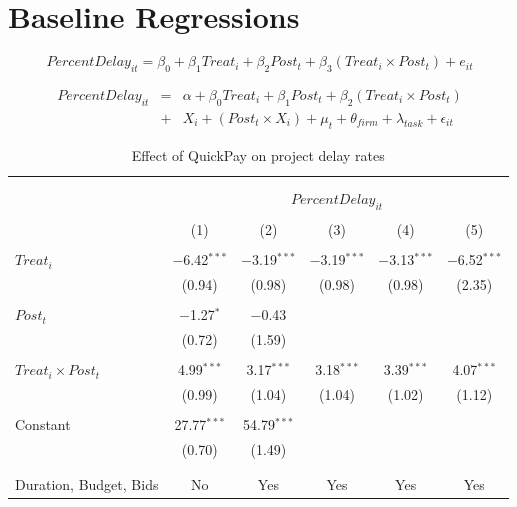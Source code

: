 \documentclass[
]{article}
\begin{document}
\hypertarget{baseline-regressions}{%
\section{Baseline Regressions}\label{baseline-regressions}}

\[ PercentDelay_{it} = \beta_0 + \beta_1 Treat_i + \beta_2 Post_t + \beta_3 (Treat_i \times Post_t) + e_{it}\]

\[ \begin{aligned} PercentDelay_{it} &=& \alpha+\beta_0 Treat_i + \beta_1 Post_t + \beta_2 (Treat_i \times Post_t)\\
&+&  X_i + (Post_t \times X_i) + \mu_t + \theta_{firm} + \lambda_{task}+ \epsilon_{it}
\end{aligned}\]

\begin{table}[H] \centering 
  \caption{Effect of QuickPay on project delay rates} 
  \label{} 
\small 
\begin{tabular}{@{\extracolsep{-2pt}}lccccc} 
\\[-1.8ex]\hline 
\hline \\[-1.8ex] 
\\[-1.8ex] & \multicolumn{5}{c}{$PercentDelay_{it}$} \\ 
\\[-1.8ex] & (1) & (2) & (3) & (4) & (5)\\ 
\hline \\[-1.8ex] 
 $Treat_i$ & $-$6.42$^{***}$ & $-$3.19$^{***}$ & $-$3.19$^{***}$ & $-$3.13$^{***}$ & $-$6.52$^{***}$ \\ 
  & (0.94) & (0.98) & (0.98) & (0.98) & (2.35) \\ 
  & & & & & \\ 
 $Post_t$ & $-$1.27$^{*}$ & $-$0.43 &  &  &  \\ 
  & (0.72) & (1.59) &  &  &  \\ 
  & & & & & \\ 
 $Treat_i \times Post_t$ & 4.99$^{***}$ & 3.17$^{***}$ & 3.18$^{***}$ & 3.39$^{***}$ & 4.07$^{***}$ \\ 
  & (0.99) & (1.04) & (1.04) & (1.02) & (1.12) \\ 
  & & & & & \\ 
 Constant & 27.77$^{***}$ & 54.79$^{***}$ &  &  &  \\ 
  & (0.70) & (1.49) &  &  &  \\ 
  & & & & & \\ 
\hline \\[-1.8ex] 
Duration, Budget, Bids & No & Yes & Yes & Yes & Yes \\ 

\end{tabular}
\end{table}
\end{document}
